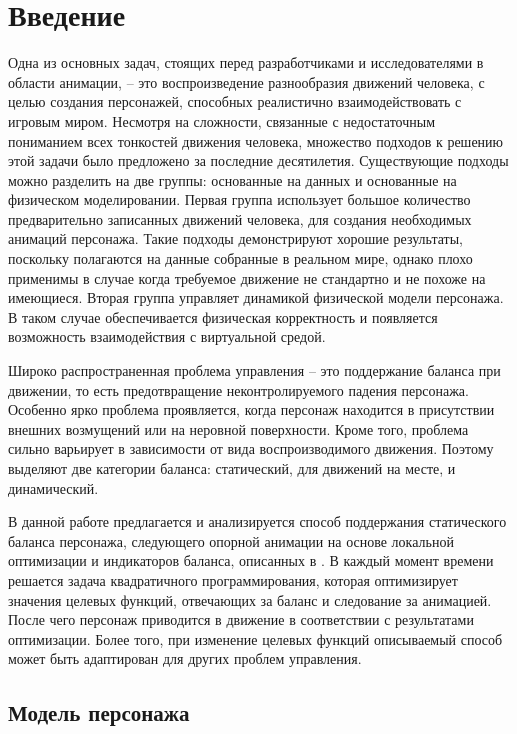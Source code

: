 \section{Введение}

Одна из основных задач, стоящих перед разработчиками и исследователями в области анимации, -- это воспроизведение разнообразия движений человека, с целью  создания персонажей, способных реалистично взаимодействовать с игровым миром. Несмотря на сложности, связанные с недостаточным пониманием всех тонкостей движения человека, множество подходов к решению этой задачи было предложено за последние десятилетия. Существующие подходы можно разделить на две группы: основанные на данных и основанные на физическом моделировании. Первая группа использует большое количество предварительно записанных движений человека, для создания необходимых анимаций персонажа. Такие подходы демонстрируют хорошие результаты, поскольку полагаются на данные собранные в реальном мире, однако плохо применимы в случае когда требуемое движение не стандартно и не похоже на имеющиеся. Вторая группа управляет динамикой физической модели персонажа. В таком случае обеспечивается физическая корректность и появляется возможность взаимодействия с виртуальной средой.

Широко распространенная проблема управления -- это поддержание баланса при движении, то есть предотвращение неконтролируемого падения персонажа. Особенно ярко проблема проявляется, когда персонаж находится в присутствии внешних возмущений или на неровной поверхности. Кроме того, проблема сильно варьирует в зависимости от вида воспроизводимого движения. Поэтому выделяют две категории баланса: статический, для движений на месте, и динамический.

В данной работе предлагается и анализируется способ поддержания статического баланса персонажа, следующего опорной анимации на основе локальной оптимизации и индикаторов баланса, описанных в \cite{MacchiettoZS}. В каждый момент времени решается задача квадратичного программирования, которая оптимизирует значения целевых функций, отвечающих за баланс и следование за анимацией. После чего персонаж приводится в движение в соответствии с результатами оптимизации. Более того, при изменение целевых функций описываемый способ может быть адаптирован для других проблем управления.

\subsection{Модель персонажа}

